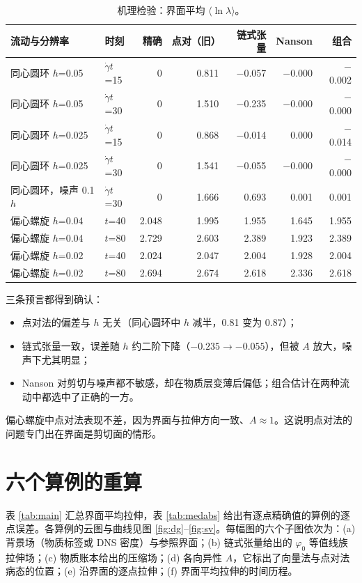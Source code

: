 \documentclass[10.5pt,a4paper]{article}
\theoremstyle{plain}
\begin{document}
\begin{table}[H]\centering\small
\caption{机理检验：界面平均 $\langle\ln\lambda\rangle$。}\label{tab:toy}
\begin{tabular}{llrrrrr}\toprule
流动与分辨率 & 时刻 & 精确 & 点对（旧） & 链式张量 & Nanson & 组合 \\\midrule
同心圆环 $h$=0.05 & $\dot\gamma t$=15 & 0 & 0.811 & $-$0.057 & $-$0.000 & $-$0.002 \\
同心圆环 $h$=0.05 & $\dot\gamma t$=30 & 0 & 1.510 & $-$0.235 & $-$0.000 & $-$0.000 \\
同心圆环 $h$=0.025 & $\dot\gamma t$=15 & 0 & 0.868 & $-$0.014 & 0.000 & $-$0.014 \\
同心圆环 $h$=0.025 & $\dot\gamma t$=30 & 0 & 1.541 & $-$0.055 & $-$0.000 & $-$0.000 \\
同心圆环，噪声 0.1$h$ & $\dot\gamma t$=30 & 0 & 1.666 & 0.693 & 0.001 & 0.001 \\
偏心螺旋 $h$=0.04 & $t$=40 & 2.048 & 1.995 & 1.955 & 1.645 & 1.955 \\
偏心螺旋 $h$=0.04 & $t$=80 & 2.729 & 2.603 & 2.389 & 1.923 & 2.389 \\
偏心螺旋 $h$=0.02 & $t$=40 & 2.024 & 2.047 & 2.004 & 1.928 & 2.004 \\
偏心螺旋 $h$=0.02 & $t$=80 & 2.694 & 2.674 & 2.618 & 2.336 & 2.618 \\\bottomrule
\end{tabular}
\end{table}

三条预言都得到确认：
\begin{itemize}
\item 点对法的偏差与 $h$ 无关（同心圆环中 $h$ 减半，0.81 变为 0.87）；
\item 链式张量一致，误差随 $h$ 约二阶下降（$-0.235\to-0.055$），但被 $A$ 放大，噪声下尤其明显；
\item Nanson 对剪切与噪声都不敏感，却在物质层变薄后偏低；组合估计在两种流动中都选中了正确的一方。
\end{itemize}
偏心螺旋中点对法表现不差，因为界面与拉伸方向一致、$A\approx1$。这说明点对法的问题专门出在界面是剪切面的情形。

\section{六个算例的重算}\label{sec:cases}

表 \ref{tab:main} 汇总界面平均拉伸，表 \ref{tab:medabs} 给出有逐点精确值的算例的逐点误差。各算例的云图与曲线见图 \ref{fig:dg}–\ref{fig:sv}。每幅图的六个子图依次为：(a) 背景场（物质标签或 DNS 密度）与参照界面；(b) 链式张量给出的 $\varphi_0$ 等值线族拉伸场；(c) 物质账本给出的压缩场；(d) 各向异性 $A$，它标出了向量法与点对法病态的位置；(e) 沿界面的逐点拉伸；(f) 界面平均拉伸的时间历程。
\end{document}

